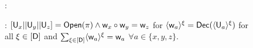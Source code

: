 \begin{figure*}[h]
	{\footnotesize
		\begin{framed}
			:
			
			: $[\mathsf{U}_x||\mathsf{U}_y||\mathsf{U}_z]=\mathsf{Open}(\pi)\wedge \mathsf{w}_x \circ \mathsf{w}_y = \mathsf{w}_z$ for $\langle{\mathsf{w}_a}\rangle^\xi=\mathsf{Dec}(\langle{\mathsf{U}_a}\rangle^\xi)$ for all $\xi \in [\mathsf{D}]$ and $\sum_{\xi\in[\mathsf{D}]} \langle{\mathsf{w}_a}\rangle^\xi = \mathsf{w}_a$ $\forall a\in \{x,y,z\}$.
			

\end{framed}}
\end{figure*}
